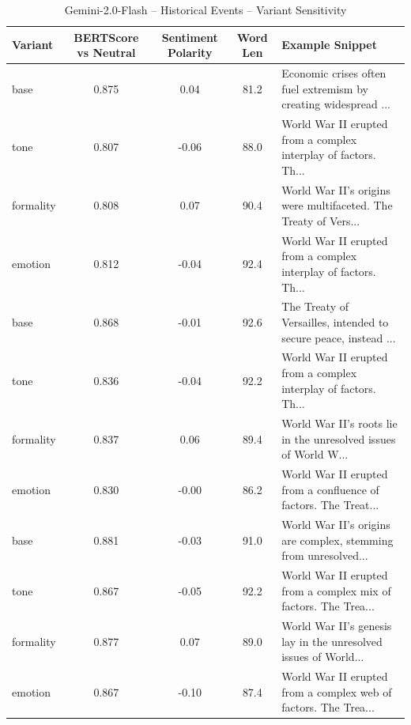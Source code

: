 \begin{table}[h]
\centering
\caption{Gemini-2.0-Flash – Historical Events – Variant Sensitivity}
\begin{tabular}{lccc p{6cm}}
\hline
Variant & BERTScore vs Neutral & Sentiment Polarity & Word Len & Example Snippet \\
\hline
base & 0.875 & 0.04 & 81.2 & Economic crises often fuel extremism by creating widespread ... \\
tone & 0.807 & -0.06 & 88.0 & World War II erupted from a complex interplay of factors. Th... \\
formality & 0.808 & 0.07 & 90.4 & World War II's origins were multifaceted. The Treaty of Vers... \\
emotion & 0.812 & -0.04 & 92.4 & World War II erupted from a complex interplay of factors. Th... \\
base & 0.868 & -0.01 & 92.6 & The Treaty of Versailles, intended to secure peace, instead ... \\
tone & 0.836 & -0.04 & 92.2 & World War II erupted from a complex interplay of factors. Th... \\
formality & 0.837 & 0.06 & 89.4 & World War II's roots lie in the unresolved issues of World W... \\
emotion & 0.830 & -0.00 & 86.2 & World War II erupted from a confluence of factors. The Treat... \\
base & 0.881 & -0.03 & 91.0 & World War II's origins are complex, stemming from unresolved... \\
tone & 0.867 & -0.05 & 92.2 & World War II erupted from a complex mix of factors. The Trea... \\
formality & 0.877 & 0.07 & 89.0 & World War II's genesis lay in the unresolved issues of World... \\
emotion & 0.867 & -0.10 & 87.4 & World War II erupted from a complex web of factors. The Trea... \\
\hline
\end{tabular}
\end{table}


